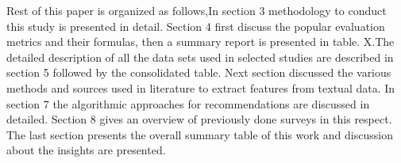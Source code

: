 \newline Rest of this paper is organized as follows,In section 3 methodology to conduct this study is presented in detail. Section 4 first discuss the popular evaluation metrics and their formulas, then a summary report is presented in table. X.The detailed description of all the data sets used in selected studies are described in section 5 followed by the consolidated table. Next section discussed the various methods and sources used in literature to extract features from textual data. In section 7 the algorithmic approaches for recommendations are discussed in detailed. Section 8 gives an overview of previously done surveys in this respect. The last section presents the overall summary table of this work and discussion about the insights are presented.
